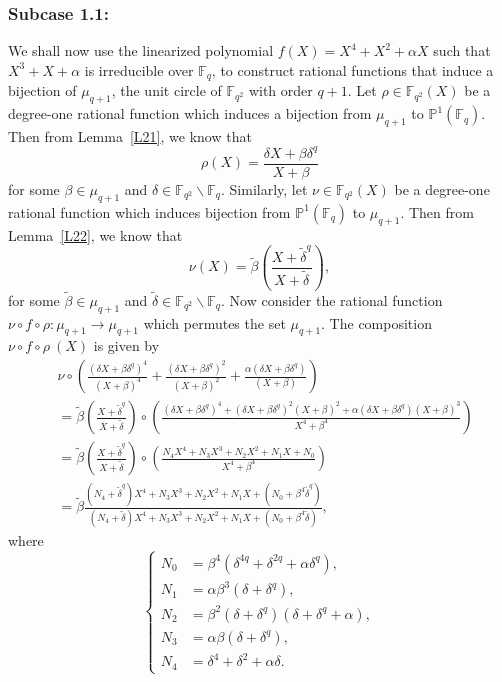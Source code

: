 \documentclass[12pt]{amsart}
\numberwithin{equation}{section}
\theoremstyle{definition}
\newcommand{\F}{\mathbb F}
\newcommand{\bP}{\mathbb P}
\begin{document}
\subsubsection*{\textbf{Subcase 1.1:}}We shall now use the linearized polynomial  $f(X)=X^4+X^2+\alpha X$ such that $X^3+X+\alpha$ is irreducible over $\F_q$, to construct rational functions that induce a bijection of $\mu_{q+1}$, the unit circle of $\F_{q^2}$ with order $q+1$. Let $\rho \in \F_{q^2}(X)$ be a degree-one rational function which induces a bijection from $\mu_{q+1}$ to $\bP^1(\F_{q})$. Then from Lemma~\ref{L21}, we know that
\[
  \rho(X) = \frac{\delta X +\beta \delta^{q}}{X+\beta}
\]
for some $\beta \in \mu_{q+1}$ and $\delta \in \F_{q^2}\backslash \F_{q}$. Similarly, let $\nu \in \F_{q^2}(X)$ be a degree-one rational function which induces bijection from $\bP^1(\F_{q})$ to $\mu_{q+1}$. Then from Lemma~\ref{L22}, we know that
\[
 \nu(X)= {\tilde \beta} \left(\frac{X +{\tilde \delta}^{q}}{X+ {\tilde \delta}}\right),
\]
for some ${\tilde \beta} \in \mu_{q+1}$ and ${\tilde \delta} \in \F_{q^2} \backslash \F_{q}$. Now consider the rational function $\nu \circ f \circ \rho : \mu_{q+1} \rightarrow \mu_{q+1}$ which permutes the set $\mu_{q+1}$. The composition $ \nu \circ f \circ \rho ~(X)$ is given by
 \begin{equation*}
  \begin{split}
  & \nu \circ \left(\frac{(\delta X +\beta \delta^q)^4}{(X+\beta)^4}+\frac{(\delta X +\beta \delta^q)^2}{(X+\beta)^2}+\frac{\alpha(\delta X +\beta \delta^q)}{(X+\beta)} \right) \\
   &=  {\tilde \beta} \left(\frac{X +{\tilde \delta}^q}{X+ {\tilde \delta}}\right) \circ \left(\frac{(\delta X +\beta \delta^q)^4 + (\delta X +\beta \delta^q)^2 (X+\beta)^2 + \alpha(\delta X +\beta \delta^q) (X+\beta)^3 }{X^4+\beta^4}\right) \\
   &= {\tilde \beta} \left(\frac{X +{\tilde \delta}^q}{X+ {\tilde \delta}}\right) \circ \left(\frac{N_4X^4+N_3X^3+N_2X^2+N_1X+N_0 }{X^4+\beta^4}\right) \\
   &= {\tilde \beta} \frac{(N_4+{\tilde \delta}^q) X^4+N_3X^3+N_2X^2+N_1X+(N_0 + \beta^4{\tilde \delta}^q) }{(N_4+{\tilde \delta}) X^4+N_3X^3+N_2X^2+N_1X+(N_0 + \beta^4{\tilde \delta}) },
  \end{split}
 \end{equation*}
 where
 \begin{equation}\label{C60}
  \begin{cases}
   N_0 &= \beta^4(\delta^{4q}+\delta^{2q}+\alpha\delta^q),\\
   N_1 &= \alpha\beta^3(\delta+\delta^q),\\
   N_2 &= \beta^2(\delta+\delta^q)(\delta+\delta^q+\alpha),\\
   N_3 &= \alpha\beta(\delta+\delta^q),\\
   N_4 &= \delta^4+\delta^2+\alpha\delta.
  \end{cases}
 \end{equation}
\end{document}
